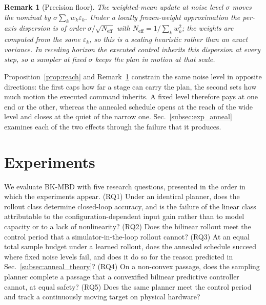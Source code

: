 \documentclass[letterpaper,10pt,conference]{ieeeconf}
\newtheorem{remark}{Remark}
\newcommand{\bkmbd}{\textsc{BK-MBD}}
\begin{document}
\begin{remark}[Precision floor]\label{rem:floor}
The weighted-mean update at noise level $\sigma$ moves the nominal by $\sigma \sum_k w_k \varepsilon_k$.
Under a locally frozen-weight approximation the per-axis dispersion is of order $\sigma / \sqrt{N_{\mathrm{eff}}}$ with $N_{\mathrm{eff}} = 1 / \sum_k w_k^{2}$; the weights are computed from the same $\varepsilon_k$, so this is a scaling heuristic rather than an exact variance.
In receding horizon the executed control inherits this dispersion at every step, so a sampler at fixed $\sigma$ keeps the plan in motion at that scale.
\end{remark}

Proposition~\ref{prop:reach} and Remark~\ref{rem:floor} constrain the same noise level in opposite directions: the first caps how far a stage can carry the plan, the second sets how much motion the executed command inherits.
A fixed level therefore pays at one end or the other, whereas the annealed schedule opens at the reach of the wide level and closes at the quiet of the narrow one.
Sec.~\ref{subsec:exp_anneal} examines each of the two effects through the failure that it produces.

\section{Experiments}\label{sec:exp}
We evaluate \bkmbd{} with five research questions, presented in the order in which the experiments appear.
(RQ1) Under an identical planner, does the rollout class determine closed-loop accuracy, and is the failure of the linear class attributable to the configuration-dependent input gain rather than to model capacity or to a lack of nonlinearity?
(RQ2) Does the bilinear rollout meet the control period that a simulator-in-the-loop rollout cannot?
(RQ3) At an equal total sample budget under a learned rollout, does the annealed schedule succeed where fixed noise levels fail, and does it do so for the reason predicted in Sec.~\ref{subsec:anneal_theory}?
(RQ4) On a non-convex passage, does the sampling planner complete a passage that a convexified bilinear predictive controller cannot, at equal safety?
(RQ5) Does the same planner meet the control period and track a continuously moving target on physical hardware?
\end{document}
